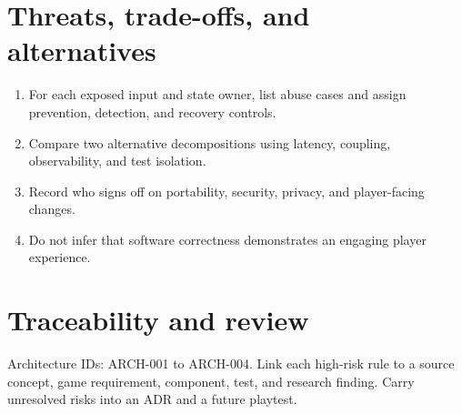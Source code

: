 \documentclass[11pt]{article}
\begin{document}
\section{Threats, trade-offs, and alternatives}
\begin{enumerate}
\item For each exposed input and state owner, list abuse cases and assign prevention, detection, and recovery controls.
\item Compare two alternative decompositions using latency, coupling, observability, and test isolation.
\item Record who signs off on portability, security, privacy, and player-facing changes.
\item Do not infer that software correctness demonstrates an engaging player experience.
\end{enumerate}

\section{Traceability and review}
Architecture IDs: ARCH-001 to ARCH-004. Link each high-risk rule to a source concept, game requirement, component, test, and research finding. Carry unresolved risks into an ADR and a future playtest.
\end{document}
